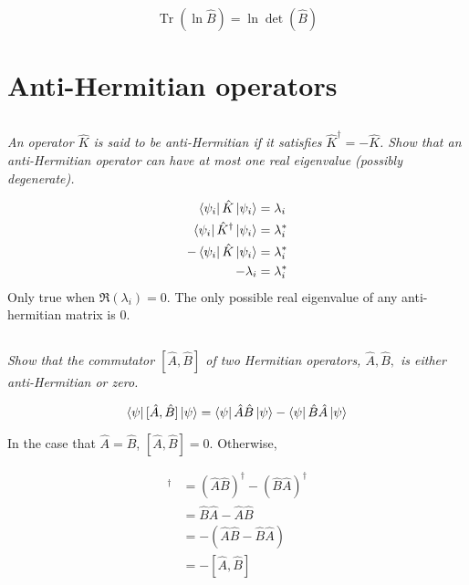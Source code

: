 \documentclass[12pt, letterpaper]{article}
\begin{document}
\begin{equation*}
\boxed{ \operatorname{Tr}\left( \ln{\hat B} \right) = \ln{\operatorname{det}\left(\hat B\right)}}
\end{equation*}


\section{Anti-Hermitian operators}
\subsection{}
\textit{An operator $\hat{K}$ is said to be anti-Hermitian if it satisfies $\hat{K}^{\dagger}=-\hat{K}$. Show that an anti-Hermitian operator can have at most one real eigenvalue (possibly degenerate).}

\begin{align*}
    \bra{\psi_i} \hat K \ket{\psi_i} &= \lambda_i \\
    \bra{\psi_i} \hat{K}^\dagger \ket{\psi_i} &= \lambda_i^* \\
    -\bra{\psi_i} \hat{K} \ket{\psi_i} &= \lambda_i^* \\
    -\lambda_i &= \lambda_i^* \\
\end{align*}
Only true when $\Re\left(\lambda_i\right)= 0$. The only possible real eigenvalue of any anti-hermitian matrix is 0. 

\subsection{}
\textit{Show that the commutator $[\hat{A}, \hat{B}]$ of two Hermitian operators, $\hat{A}, \hat{B},$ is either anti-Hermitian or zero.}

$$
\bra \psi [\hat{A}, \hat{B}] \ket \psi = \bra \psi \hat{A}\hat{B} \ket \psi -\bra \psi \hat{B}\hat{A} \ket \psi 
$$

In the case that $\hat{A}= \hat{B}$, $[\hat{A}, \hat{B}] = 0$. Otherwise, 

\begin{align*}
    [\hat{A}, \hat{B}]^\dagger &= \left(\hat A \hat B \right)^\dagger - \left(\hat B \hat A \right)^\dagger \\
    &=\hat B \hat A -\hat A \hat B\\
    &=-\left(\hat A \hat B-\hat B \hat A  \right)\\
    &= - [\hat{A}, \hat{B}]\\
\end{align*}
\end{document}
